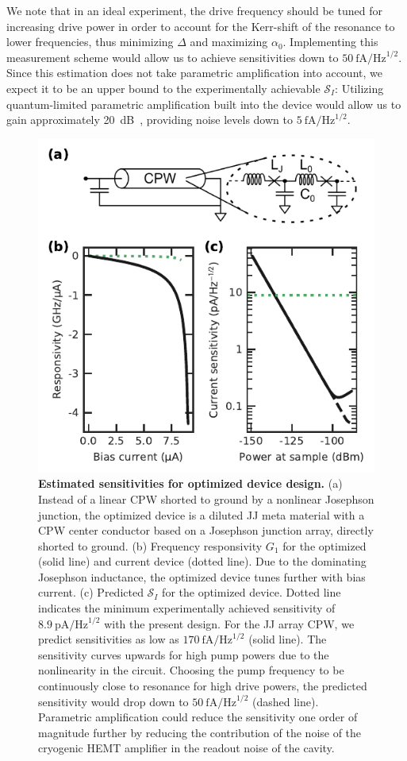 % 
We note that in an ideal experiment, the drive frequency should be tuned for increasing drive power in order to account for the Kerr-shift of the resonance to lower frequencies, thus minimizing $\Delta$ and maximizing $\alpha_0$.
% 
Implementing this measurement scheme would allow us to achieve sensitivities down to $\SI{50}{\femto\ampere\per\hertz\tothe{1/2}}$.
% 
Since this estimation does not take parametric amplification into account, we expect it to be an upper bound to the experimentally achievable $\mathcal{S}_I$:
% 
Utilizing quantum-limited parametric amplification built into the device would allow us to gain approximately \SI{20}{dB}~\cite{stehlikFastChargeSensing2015,pogorzalekHystereticFluxResponse2017,planatUnderstandingSaturationPower2019}, providing noise levels down to $\SI{5}{\femto\ampere\per\hertz\tothe{1/2}}$.

\begin{figure}
	\centering
	\includegraphics[width=.5\linewidth]{chapter-currentdetection/figures/Figure5}
	\caption{
		\textbf{Estimated sensitivities for optimized device design.}
		(a) Instead of a linear CPW shorted to ground by a nonlinear Josephson junction, the optimized device is a diluted JJ meta material with a CPW center conductor based on a Josephson junction array, directly shorted to ground.
		(b) Frequency responsivity $G_1$ for the optimized (solid line) and current device (dotted line).
		Due to the dominating Josephson inductance, the optimized device tunes further with bias current.
		(c) Predicted $\mathcal{S}_I$ for the optimized device.
		Dotted line indicates the minimum experimentally achieved sensitivity of $\SI{8.9}{\pico\ampere\per\hertz\tothe{1/2}}$ with the present design.
		For the JJ array CPW, we predict sensitivities as low as $\SI{170}{\femto\ampere\per\hertz\tothe{1/2}}$ (solid line).
		The sensitivity curves upwards for high pump powers due to the nonlinearity in the circuit.
		Choosing the pump frequency to be continuously close to resonance for high drive powers, the predicted sensitivity would drop down to $\SI{50}{\femto\ampere\per\hertz\tothe{1/2}}$ (dashed line).
		Parametric amplification could reduce the sensitivity one order of magnitude further by reducing the contribution of the noise of the cryogenic HEMT amplifier in the readout noise of the cavity.
		\label{fig:figure5}
	}
\end{figure}

